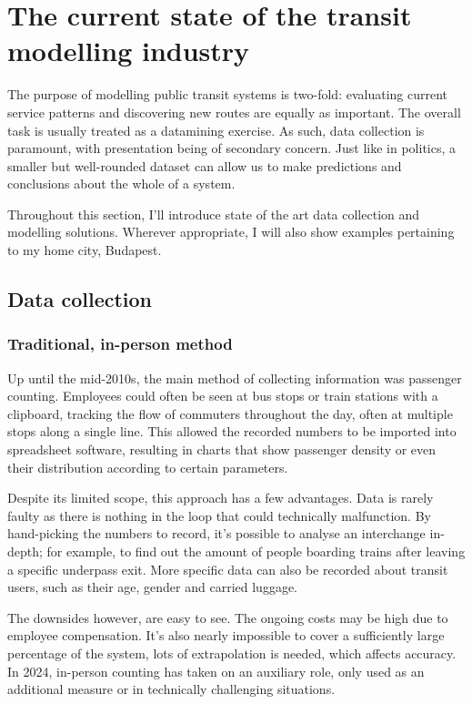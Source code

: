 \chapter{The current state of the transit modelling industry}
The purpose of modelling public transit systems is two-fold: evaluating current service patterns and discovering new routes are equally as important. The overall task is usually treated as a datamining exercise. As such, data collection is paramount, with presentation being of secondary concern. Just like in politics, a smaller but well-rounded dataset can allow us to make predictions and conclusions about the whole of a system.

Throughout this section, I'll introduce state of the art data collection and modelling solutions. Wherever appropriate, I will also show examples pertaining to my home city, Budapest.

\section{Data collection}
\subsection{Traditional, in-person method}

Up until the mid-2010s, the main method of collecting information was passenger counting. Employees could often be seen at bus stops or train stations with a clipboard, tracking the flow of commuters throughout the day, often at multiple stops along a single line. This allowed the recorded numbers to be imported into spreadsheet software, resulting in charts that show passenger density or even their distribution according to certain parameters.

Despite its limited scope, this approach has a few advantages. Data is rarely faulty as there is nothing in the loop that could technically malfunction. By hand-picking the numbers to record, it's possible to analyse an interchange in-depth; for example, to find out the amount of people boarding trains after leaving a specific underpass exit. More specific data can also be recorded about transit users, such as their age, gender and carried luggage.

The downsides however, are easy to see. The ongoing costs may be high due to employee compensation. It's also nearly impossible to cover a sufficiently large percentage of the system, lots of extrapolation is needed, which affects accuracy. In 2024, in-person counting has taken on an auxiliary role, only used as an additional measure or in technically challenging situations.

